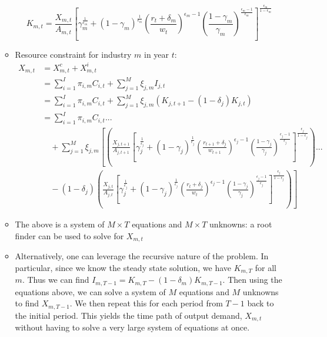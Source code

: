 \documentclass[letterpaper,12pt]{article}
\theoremstyle{definition}
\begin{document}
\begin{spacing}{1.5}
\begin{enumerate}
\begin{itemize}
	\begin{equation}
	\label{eqn:k_demand2}
	K_{m,t} = \frac{X_{m,t}}{A_{m,t}}\left[\gamma_{m}^{\frac{1}{\epsilon_{m}}}+(1-\gamma_{m})^{\frac{1}{\epsilon_{m}}}\left(\frac{r_{t}+\delta_{m}}{w_{t}}\right)^{\epsilon_{m}-1}\left(\frac{1-\gamma_{m}}{\gamma_{m}}	\right)^{\frac{\epsilon_{m}-1}{\epsilon_{m}}}\right]^{\frac{\epsilon_{m}}{1-\epsilon_{m}}}
	\end{equation}
	
	\item Resource constraint for industry $m$ in year $t$: 
	\begin{equation}
	\begin{split}
	X_{m,t} &= X^{c}_{m,t} + X^{i}_{m,t} \\
	&= \sum_{i=1}^{I} \pi_{i,m}C_{i,t} +\sum_{j=1}^{M} \xi_{j,m}I_{j,t} \\
	 &= \sum_{i=1}^{I} \pi_{i,m}C_{i,t} +\sum_{j=1}^{M} \xi_{j,m}\left(K_{j,t+1} - (1-\delta_{j})K_{j,t} \right)  \\
	 &= \sum_{i=1}^{I} \pi_{i,m}C_{i,t} ... \\
	 & \quad +\sum_{j=1}^{M} \xi_{j,m}\left[\left( \frac{X_{j,t+1}}{A_{j,t+1}}\left[\gamma_{j}^{\frac{1}{\epsilon_{j}}}+(1-\gamma_{j})^{\frac{1}{\epsilon_{j}}}\left(\frac{r_{t+1}+\delta_{j}}{w_{t+1}}\right)^{\epsilon_{j}-1}\left(\frac{1-\gamma_{j}}{\gamma_{j}}\right)^{\frac{\epsilon_{j}-1}{\epsilon_{j}}}\right]^{\frac{\epsilon_{j}}{1-\epsilon_{j}}}\right) ... \right. \\
	 & \left. \quad - (1-\delta_{j})\left( \frac{X_{j,t}}{A_{j,t}}\left[\gamma_{j}^{\frac{1}{\epsilon_{j}}}+(1-\gamma_{j})^{\frac{1}{\epsilon_{j}}}\left(\frac{r_{t}+\delta_{j}}{w_{t}}\right)^{\epsilon_{j}-1}\left(\frac{1-\gamma_{j}}{\gamma_{j}}	\right)^{\frac{\epsilon_{j}-1}{\epsilon_{j}}}\right]^{\frac{\epsilon_{j}}{1-\epsilon_{j}}}\right) \right]
	\end{split}
	\end{equation}
	
	\item The above is a system of $M\times T$ equations and $M\times T$ unknowns: a root finder can be used to solve for $X_{m,t}$
	\item Alternatively, one can leverage the recursive nature of the problem.  In particular, since we know the steady state solution, we have $K_{m,T}$ for all $m$.  Thus we can find $I_{m,T-1} = K_{m,T} - (1-\delta_{m})K_{m,T-1}$.  Then using the equations above, we can solve a system of $M$ equations and $M$ unknowns to find $X_{m,T-1}$.  We then repeat this for each period from $T-1$ back to the initial period.  This yields the time path of output demand, $X_{m,t}$ without having to solve a very large system of equations at once.
	\end{itemize}


\end{enumerate}
\end{spacing}
\end{document}
